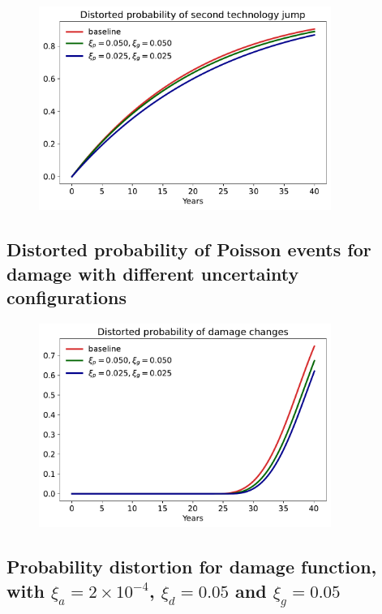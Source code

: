\documentclass[12pt]{article}
\begin{document}
\begin{figure}[H]
	\centering
	\includegraphics[width=0.85\textwidth]{../figures/xi_comparison/20damage/Tech_jump_second.pdf}
\end{figure}

\subsection{Distorted probability of Poisson events for damage with different uncertainty configurations}


\begin{figure}[H]
	\centering
	\includegraphics[width=0.85\textwidth]{../figures/xi_comparison/20damage/Damage_prob.pdf}
\end{figure}

\subsection{Probability distortion for damage function, with $\xi_a = 2\times 10^{-4}$, $\xi_d = 0.05$ and $\xi_g = 0.05$}
\end{document}
